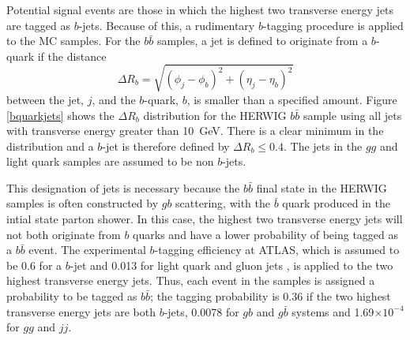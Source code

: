 Potential signal events are those in which the highest two transverse energy jets are tagged as $b$-jets. Because of this, a rudimentary $b$-tagging procedure is applied to the MC samples. For the $b\bar{b}$ samples, a jet is defined to originate from a $b$-quark if the distance
\begin{equation}
\Delta R_{b} = \sqrt{\left(\phi_{j}-\phi_b\right)^2 + \left(\eta_{j}-\eta_b\right)^2}
\end{equation}
between the jet, $j$, and the $b$-quark, $b$, is smaller than a specified amount. Figure \ref{bquarkjets} shows the $\Delta R_{b}$ distribution for the HERWIG $b\bar{b}$ sample using all jets with transverse energy greater than 10~GeV. There is a clear minimum in the distribution and a $b$-jet is therefore defined by $\Delta R_{b} \leq 0.4$. The jets in the $gg$ and light quark samples are assumed to be non $b$-jets.

This designation of jets is necessary because the $b\bar{b}$ final state in the HERWIG samples is often constructed by $gb$ scattering, with the $\bar{b}$ quark produced in the intial state parton shower. In this case, the highest two transverse energy jets will not both originate from $b$ quarks and have a lower probability of being tagged as a $b\bar{b}$ event.
The experimental $b$-tagging efficiency at ATLAS, which is assumed to be 0.6 for a $b$-jet and 0.013 for light quark and gluon jets \cite{:1999fq}, is applied to the two highest transverse energy jets. Thus, each event in the samples is assigned a probability to be tagged as $b\bar{b}$; the tagging probability is 0.36 if the two highest transverse energy jets are both $b$-jets, 0.0078 for $gb$ and $g\bar{b}$ systems and 1.69$\times10^{-4}$ for $gg$ and $jj$.

